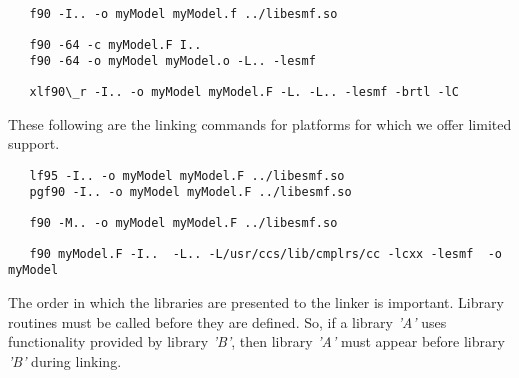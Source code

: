
\begin{verbatim}
   f90 -I.. -o myModel myModel.f ../libesmf.so
\end{verbatim}


\begin{verbatim}
   f90 -64 -c myModel.F I.. 
   f90 -64 -o myModel myModel.o -L.. -lesmf
\end{verbatim}


\begin{verbatim}
   xlf90\_r -I.. -o myModel myModel.F -L. -L.. -lesmf -brtl -lC
\end{verbatim}

These following are the linking commands for platforms for which 
we offer limited support.

 
\begin{verbatim}
   lf95 -I.. -o myModel myModel.F ../libesmf.so
   pgf90 -I.. -o myModel myModel.F ../libesmf.so
\end{verbatim}


\begin{verbatim}
   f90 -M.. -o myModel myModel.F ../libesmf.so
\end{verbatim}


\begin{verbatim}
   f90 myModel.F -I..  -L.. -L/usr/ccs/lib/cmplrs/cc -lcxx -lesmf  -o myModel
\end{verbatim}

The order in which the libraries are presented to the linker is important. Library routines must be called before they are defined. So, if a library \emph{'A'} uses functionality provided by library \emph{'B'}, then library \emph{'A'} must appear before library \emph{'B'} during linking. 






